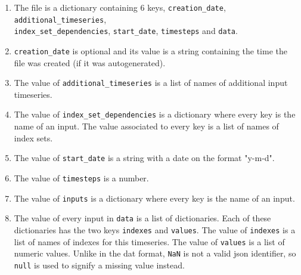 \documentclass[11pt]{article}
\theoremstyle{definition}
\begin{document}
\begin{enumerate}[i]
\item The file is a dictionary containing 6 keys, {\tt creation\_date}, {\tt additional\_timeseries}, \\{\tt index\_set\_dependencies}, {\tt start\_date}, {\tt timesteps} and {\tt data}.
\item {\tt creation\_date} is optional and its value is a string containing the time the file was created (if it was autogenerated).
\item The value of {\tt additional\_timeseries} is a list of names of additional input timeseries.
\item The value of {\tt index\_set\_dependencies} is a dictionary where every key is the name of an input. The value associated to every key is a list of names of index sets.
\item The value of {\tt start\_date} is a string with a date on the format "y-m-d".
\item The value of {\tt timesteps} is a number.
\item The value of {\tt inputs} is a dictionary where every key is the name of an input.
\item The value of every input in {\tt data} is a list of dictionaries. Each of these dictionaries has the two keys {\tt indexes} and {\tt values}. The value of {\tt indexes} is a list of names of indexes for this timeseries. The value of {\tt values} is a list of numeric values. Unlike in the dat format, {\tt NaN} is not a valid json identifier, so {\tt null} is used to signify a missing value instead.
\end{enumerate}



\end{document}

